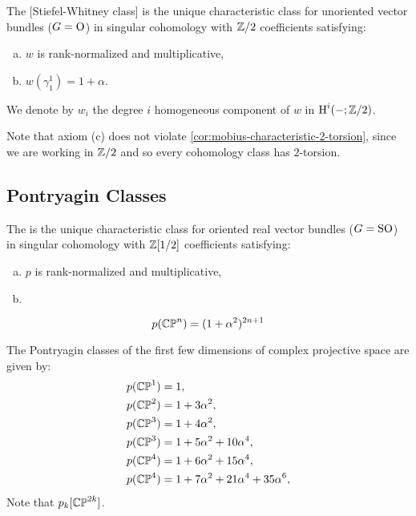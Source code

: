 \begin{definition}
	The [Stiefel-Whitney class] is the unique characteristic class for unoriented vector bundles ($G=
		\mathrm{O}$) in singular cohomology with $\mathbb{Z}/2$ coefficients satisfying:
	\begin{enumerate}[(a)]
		\item $w$ is rank-normalized and multiplicative,
		\item $w(\gamma^1_1)=1+\alpha$.
	\end{enumerate}
	We denote by $w_i$ the degree $i$ homogeneous component of $w$ in $\operatorname{H}^i(-;\mathbb{Z}/2)$.
\end{definition}

\begin{remark}
	Note that axiom (c) does not violate \cref{cor:mobius-characteristic-2-torsion}, since we are working in $\mathbb{Z}/2$ and so every cohomology class has $2$-torsion.
\end{remark}

\subsection{Pontryagin Classes}

\begin{definition}
	The  is the unique characteristic class for oriented real vector bundles ($G=\mathrm{SO}$) in singular cohomology with $\mathbb{Z}[1/2]$ coefficients satisfying:
	\begin{enumerate}[(a)]
		\item $p$ is rank-normalized and multiplicative,
		\item
	\end{enumerate}
\end{definition}

\begin{proposition}\label{prop:pontryagin-class-complex-projective-space}
	\[
		p(\mathbb{CP}^n) = (1+\alpha^2)^{2n+1}
	\]
\end{proposition}

\begin{example}
	The Pontryagin classes of the first few dimensions of complex projective space are given by:
	\[
		\begin{aligned}
			p(\mathbb{CP}^1) & = 1,                                    \\
			p(\mathbb{CP}^2) & = 1+3\alpha^2,                          \\
			p(\mathbb{CP}^3) & = 1+4\alpha^2,                          \\
			p(\mathbb{CP}^3) & = 1+5\alpha^2 + 10\alpha^4,             \\
			p(\mathbb{CP}^4) & = 1+6\alpha^2 + 15\alpha^4,             \\
			p(\mathbb{CP}^4) & = 1+7\alpha^2 + 21\alpha^4+ 35\alpha^6, \\
		\end{aligned}
	\]
	Note that $p_k[\mathbb{CP}^{2k}]$.
\end{example}

